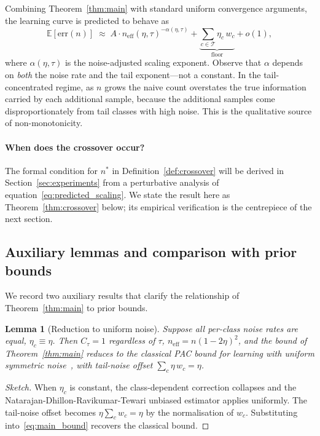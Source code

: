 \documentclass[11pt]{article}
\newtheorem{lemma}[theorem]{Lemma}
\begin{document}
Combining Theorem~\ref{thm:main} with standard uniform convergence arguments, the learning curve is predicted to behave as
\begin{equation}
\mathbb{E}[\mathrm{err}(n)] \;\approx\; A \cdot n_{\mathrm{eff}}(\eta, \tau)^{-\alpha(\eta, \tau)} + \underbrace{\sum_{c \in \mathcal{T}} \eta_c \, w_c}_{\text{floor}} + o(1), \label{eq:predicted_scaling}
\end{equation}
where $\alpha(\eta, \tau)$ is the noise-adjusted scaling exponent. Observe that $\alpha$ depends on \emph{both} the noise rate and the tail exponent---not a constant. In the tail-concentrated regime, as $n$ grows the naive count overstates the true information carried by each additional sample, because the additional samples come disproportionately from tail classes with high noise. This is the qualitative source of non-monotonicity.

\paragraph{When does the crossover occur?} The formal condition for $n^{*}$ in Definition~\ref{def:crossover} will be derived in Section~\ref{sec:experiments} from a perturbative analysis of equation~\eqref{eq:predicted_scaling}. We state the result here as Theorem~\ref{thm:crossover} below; its empirical verification is the centrepiece of the next section.

\subsection{Auxiliary lemmas and comparison with prior bounds}

We record two auxiliary results that clarify the relationship of Theorem~\ref{thm:main} to prior bounds.

\begin{lemma}[Reduction to uniform noise]
\label{lem:reduction}
Suppose all per-class noise rates are equal, $\eta_c \equiv \eta$. Then $C_{\tau} = 1$ regardless of $\tau$, $n_{\mathrm{eff}} = n(1-2\eta)^{2}$, and the bound of Theorem~\ref{thm:main} reduces to the classical PAC bound for learning with uniform symmetric noise~\cite{natarajan2013}, with tail-noise offset $\sum_c \eta \, w_c = \eta$.
\end{lemma}

\begin{proof}[Sketch]
When $\eta_c$ is constant, the class-dependent correction collapses and the Natarajan-Dhillon-Ravikumar-Tewari unbiased estimator applies uniformly. The tail-noise offset becomes $\eta \sum_c w_c = \eta$ by the normalisation of $w_c$. Substituting into~\eqref{eq:main_bound} recovers the classical bound.
\end{proof}
\end{document}

